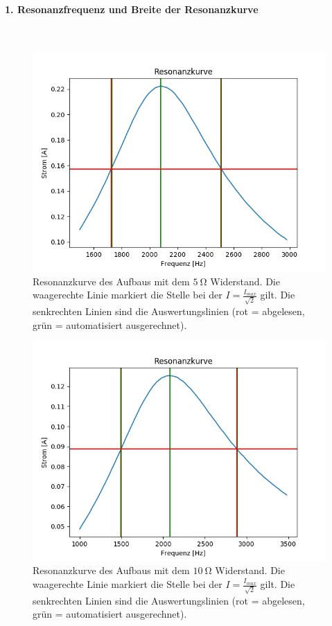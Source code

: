 \documentclass[12pt,a4paper]{article}
\begin{document}
\paragraph{1. Resonanzfrequenz und Breite der Resonanzkurve}\mbox{}\\
\begin{figure}
\centering
\includegraphics[scale=0.8]{Bilder/Serie_Resonanzkurve_A_5.png}
\caption{Resonanzkurve des Aufbaus mit dem $\SI{5}{\ohm}$ Widerstand. Die waagerechte Linie markiert die Stelle bei der $I = \frac{I_{max}}{\sqrt{2}}$ gilt. Die senkrechten Linien sind die Auswertungslinien (rot = abgelesen, grün = automatisiert ausgerechnet).}
\label{fig:Serie_Resonanzkurve_A_5}
\end{figure}
\begin{figure}
\centering
\includegraphics[scale=0.8]{Bilder/Serie_Resonanzkurve_A_10.png}
\caption{Resonanzkurve des Aufbaus mit dem $\SI{10}{\ohm}$ Widerstand. Die waagerechte Linie markiert die Stelle bei der $I = \frac{I_{max}}{\sqrt{2}}$ gilt. Die senkrechten Linien sind die Auswertungslinien (rot = abgelesen, grün = automatisiert ausgerechnet).}
\label{fig:Serie_Resonanzkurve_A_10}
\end{figure}
\end{document}
